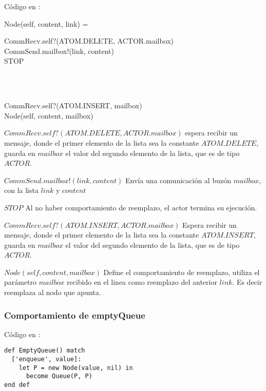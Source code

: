 Código en \CSPm:

\begin{process}
Node(self, content, link) = \\ \quad
  \begin{block}
  CommRecv.self?(ATOM.DELETE, ACTOR.mailbox) \then \\
  CommSend.mailbox!(link, content) \then \\
  STOP
  \end{block} \\

  \Extchoice \\ \quad
  
  \begin{block}
  CommRecv.self?(ATOM.INSERT, mailbox) \then \\
  Node(self, content, mailbox)
  \end{block}
\end{process}

\begin{description}
 \item $CommRecv.self?(ATOM.DELETE, ACTOR.mailbox)$ espera recibir un mensaje, donde el primer elemento de la lista sea la constante $ATOM.DELETE$, guarda en $mailbox$ el valor del segundo elemento de la lista, que es de tipo $ACTOR$.
 \item $CommSend.mailbox!(link, content)$ Envía una comunicación al buzón $mailbox$, con la lista $link$ y $content$
 \item $STOP$ Al no haber comportamiento de reemplazo, el actor termina su ejecución.
 \item $CommRecv.self?(ATOM.INSERT, ACTOR.mailbox)$ Espera recibir un mensaje, donde el primer elemento de la lista sea la constante $ATOM.INSERT$, guarda en $mailbox$ el valor del segundo elemento de la lista, que es de tipo $ACTOR$.
 \item $Node(self, content, mailbox)$ Define el comportamiento de reemplazo, utiliza el parámetro $mailbox$ recibido en el linea como reemplazo del anterior $link$. Es decir reemplaza al nodo que apunta.
\end{description}

\subsubsection*{Comportamiento de emptyQueue}

Código en \SAL:

\begin{lstlisting}[language=sal, style=simple]
def EmptyQueue() match
  ['enqueue', value]:
    let P = new Node(value, nil) in
      become Queue(P, P)
end def
\end{lstlisting}

